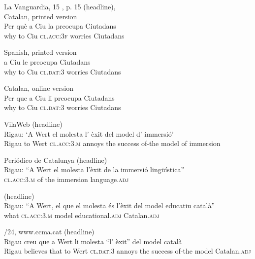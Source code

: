 \documentclass[output=paper,modfonts,nonflat,newtxmath]{langsci/langscibook}
\begin{document}
\ea%
 {La} {Vanguardia}, 15 \citealt{May2015}, p. 15 (headline), 
 \label{ex:royo:5}\\
 \ea Catalan, printed version \label{ex:royo:5a}\\
 \gll Per què a Ciu la preocupa Ciutadans \\
 why to Ciu \textsc{cl.acc:3f} worries Ciutadans
 \\
 \glt
 
 \ex Spanish, printed version \label{ex:royo:5b}\\
  a Ciu le preocupa Ciutadans\\
 why to Ciu \textsc{cl.dat:3} worries Ciutadans\\
 \glt
 
\ex Catalan, online version \label{ex:royo:5c}\\
 \gll Per que a Ciu li preocupa Ciutadans \\
 why to Ciu \textsc{cl.dat:3} worries Ciutadans\\
 \glt
 
 \z
 \z


\ea%
 \label{ex:royo:6}
 \ea VilaWeb (headline)\\
 \gll Rigau: ‘A Wert el molesta l’ èxit del model d’ immersió’\\
 Rigau to Wert \textsc{cl.acc:3.m} annoys the success of-the model of immersion \\
 \glt
 
  {Periódico} {de} {Catalunya} (headline)\\
 \gll Rigau: “A Wert el molesta l’èxit de la immersió lingüística”\\
 \textsc{cl.acc:3.m} of the immersion language.\textsc{adj}\\
 \glt
 
  (headline)\\
 \gll Rigau: “A Wert, el que el molesta és l’èxit del model educatiu català”\\
 what \textsc{cl.acc:3.m} model educational.\textsc{adj} Catalan.\textsc{adj}\\
 \glt 
 
 \z
 \z



\ea%
 \label{ex:royo:7}
 /24, www.ccma.cat (headline)\\
 \gll Rigau creu que a Wert li molesta “l' èxit” del model català\\
 Rigau believes that to Wert \textsc{cl.dat:3} annoys the success of-the model Catalan.\textsc{adj}\\
 \glt
 
\end{document}
